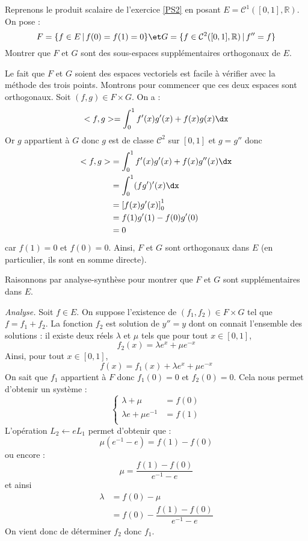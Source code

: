 \documentclass[a4paper,10pt]{report}
\begin{document}
\begin{Exercice}{} Reprenons le produit scalaire de l'exercice \ref{PS2} en posant $E= \mathcal{C}^1([0,1],\mathbb{R})$. On pose :
$$ F = \lbrace f \in E \, \vert \, f(0)=f(1)=0\rbrace \et G= \lbrace f \in \mathcal{C}^2([0,1],\mathbb{R}) \, \vert \, f''=f \rbrace$$
Montrer que $F$ et $G$ sont des sous-espaces supplémentaires orthogonaux  de $E$.
\end{Exercice}

\corr Le fait que $F$ et $G$ soient des espaces vectoriels est facile à vérifier avec la méthode des trois points. Montrons pour commencer que ces deux espaces sont orthogonaux. Soit $(f,g) \in F \times G$. On a :
$$<f,g>= \int_{0}^1 f'(x)g'(x)+f(x)g(x) \dx$$
Or $g$ appartient à $G$ donc $g$ est de classe $\mathcal{C}^2$ sur $[0,1]$ et $g=g''$ donc 
\begin{align*}
 <f,g> & = \int_{0}^1 f'(x)g'(x)+f(x)g''(x) \dx \\
 & = \int_{0}^1 (fg')'(x) \dx \\
 &= \left[ f(x)g'(x) \right]_0^1 \\
 & = f(1)g'(1)-f(0)g'(0) \\
 & = 0
 \end{align*}
 car $f(1)=0$ et $f(0)=0$. Ainsi, $F$ et $G$ sont orthogonaux dans $E$ (en particulier, ils sont en somme directe).
 
 \medskip
 
 \noindent Raisonnons par analyse-synthèse pour montrer que $F$ et $G$ sont supplémentaires dans $E$.
 
 \medskip
 
 \noindent \textit{Analyse.} Soit $f \in E$. On suppose l'existence de $(f_1,f_2) \in F \times G$ tel que $f=f_1+f_2$. La fonction $f_2$ est solution de $y''=y$ dont on connait l'ensemble des solutions : il existe deux réels $\lambda$ et $\mu$ tels que pour tout $x \in [0,1]$,
 $$ f_2(x) = \lambda e^x + \mu e^{-x}$$
 Ainsi, pour tout $x \in [0,1]$,
 $$ f(x)= f_1(x) + \lambda e^x + \mu e^{-x}$$
 On sait que $f_1$ appartient à $F$ donc $f_1(0)=0$ et $f_2(0) =0$. Cela nous permet d'obtenir un système :
 $$ \left\lbrace \begin{array}{rl}
 \lambda + \mu & = f(0) \\
 \lambda e+ \mu e^{-1} & = f(1) \\
 \end{array}\right.$$
 L'opération $L_2 \leftarrow e L_1$ permet d'obtenir que :
 $$ \mu (e^{-1}-e) = f(1)-f(0)$$
 ou encore :
 $$ \mu = \dfrac{f(1)-f(0)}{e^{-1}-e}$$
 et ainsi
 \begin{align*}
 \lambda & = f(0)- \mu \\
 & = f(0) - \dfrac{f(1)-f(0)}{e^{-1}-e} 
 \end{align*}
 On vient donc de déterminer $f_2$ donc $f_1$.
 \medskip
 
\end{document}

